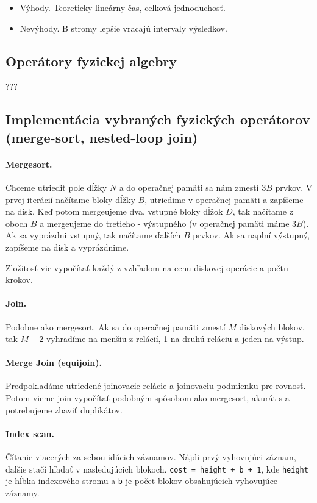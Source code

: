 \documentclass[10pt,a4paper]{article}
\begin{document}
\begin{itemize}
\item Výhody. Teoreticky lineárny čas, celková jednoduchosť.
\item Nevýhody. B stromy lepšie vracajú intervaly výsledkov. 
\end{itemize}

\subsection{Operátory fyzickej algebry}
???


\subsection{Implementácia vybraných fyzických operátorov (merge-sort, nested-loop join)}

\paragraph{Mergesort.}
Chceme utriediť pole dĺžky $N$ a do operačnej pamäti sa nám zmestí $3B$ prvkov.
V prvej iterácií načítame bloky dĺžky $B$, utriedime v operačnej pamäti a zapíšeme na disk. 
Keď potom mergeujeme dva, vstupné bloky dĺžok $D$, tak načítame z oboch $B$ a mergeujeme do tretieho - výstupného (v operačnej pamäti máme $3B$). Ak sa vyprázdni vstupný, tak načítame ďalších $B$ prvkov. Ak sa naplní výstupný, zapíšeme na disk a vyprázdnime. 

Zložitosť vie vypočítať každý z vzhľadom na cenu diskovej operácie a počtu krokov. 

\paragraph{Join.}
Podobne ako mergesort. Ak sa do operačnej pamäti zmestí $M$ diskových blokov,
tak $M-2$ vyhradíme na menšiu z relácií, 1 na druhú reláciu a jeden na výstup. 

\paragraph{Merge Join (equijoin).}
Predpokladáme utriedené joinovacie relácie a joinovaciu podmienku pre rovnosť.
Potom vieme join vypočítať podobným spôsobom ako mergesort, akurát s a potrebujeme zbaviť duplikátov. 

\paragraph{Index scan.}
Čítanie viacerých za sebou idúcich záznamov.
Nájdi prvý vyhovujúci záznam, ďalšie stačí hľadať v nasledujúcich blokoch.
\verb|cost = height + b + 1|, kde \verb|height| je hĺbka indexového stromu a
\verb|b| je počet blokov obsahujúcich vyhovujúce záznamy.
\end{document}
